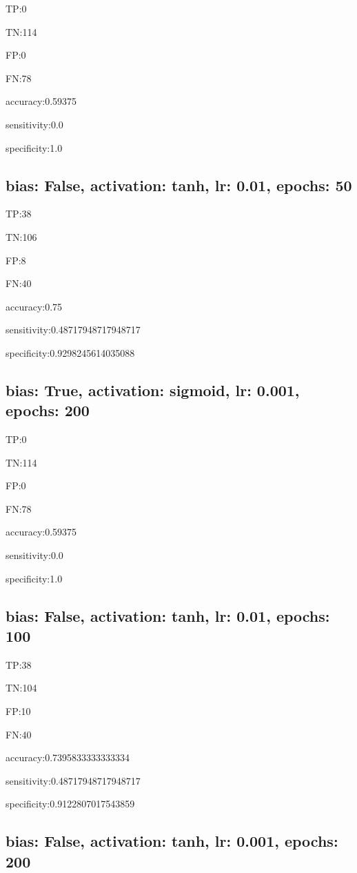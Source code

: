 \documentclass{article}
\begin{document}
TP:0

TN:114

FP:0

FN:78

accuracy:0.59375

sensitivity:0.0

specificity:1.0



\subsection{bias: False, activation: tanh, lr: 0.01, epochs: 50}

TP:38

TN:106

FP:8

FN:40

accuracy:0.75

sensitivity:0.48717948717948717

specificity:0.9298245614035088



\subsection{bias: True, activation: sigmoid, lr: 0.001, epochs: 200}

TP:0

TN:114

FP:0

FN:78

accuracy:0.59375

sensitivity:0.0

specificity:1.0



\subsection{bias: False, activation: tanh, lr: 0.01, epochs: 100}

TP:38

TN:104

FP:10

FN:40

accuracy:0.7395833333333334

sensitivity:0.48717948717948717

specificity:0.9122807017543859



\subsection{bias: False, activation: tanh, lr: 0.001, epochs: 200}
\end{document}

